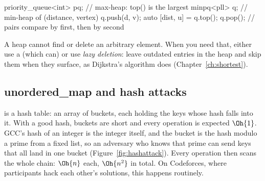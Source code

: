 \begin{code}
priority_queue<int> pq;                // max-heap: top() is the largest
minpq<pll> q;                          // min-heap of (distance, vertex)
q.push({d, v});
auto [dist, u] = q.top(); q.pop();     // pairs compare by first, then by second
\end{code}

A heap cannot find or delete an arbitrary element. When you need that, either use a  (which can) or use
\emph{lazy deletion}: leave outdated entries in the heap and skip them when they surface, as Dijkstra's algorithm does
(Chapter~\ref{ch:shortest}).

\subsection{unordered\_map and hash attacks}

 is a hash table: an array of buckets, each holding the keys whose hash falls into it. With a good hash,
buckets are short and every operation is expected $\Oh{1}$. GCC's hash of an integer is the integer itself, and the bucket is
the hash modulo a prime from a fixed list, so an adversary who knows that prime can send keys that all land in one bucket
(Figure~\ref{fig:hashattack}). Every operation then scans the whole chain: $\Oh{n}$ each, $\Oh{n^2}$ in total. On Codeforces,
where participants hack each other's solutions, this happens routinely.

